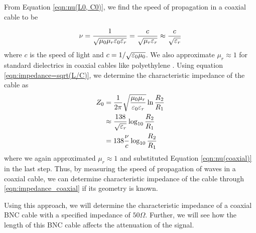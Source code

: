 \documentclass[
	a4paper, %
	10pt, %
	twoside, %
]{journal}
\begin{document}
From Equation \ref{eqn:nu(L0, C0)}, we find the speed of propagation in a coaxial cable to be 

\begin{equation}
    \label{eqn:nu(coaxial)}
    \nu = \frac1{\sqrt{\mu_0\mu_r\varepsilon_0\varepsilon_r}} = \frac{c}{\sqrt{\mu_r \varepsilon_r}} \approx \frac{c}{\sqrt{\varepsilon_r}}
\end{equation}
where $c$ is the speed of light and $c = 1/\sqrt{\varepsilon_0\mu_0}$. We also approximate $\mu_r \approx 1$ for standard dielectrics in coaxial cables like polyethylene \autocite{PHYS401Lecture04}. Using equation \ref{eqn:impedance=sqrt(L/C)}, we determine the characteristic impedance of the cable as 
\begin{align}
    Z_0 &= \frac1{2\pi}\sqrt{\frac{\mu_0\mu_r}{\varepsilon_0\varepsilon_r}} \ln \frac{R_2}{R_1} \\ 
    &\approx \frac{138}{\sqrt{\varepsilon_r}} \log_{10} \frac{R_2}{R_1}\\
    \label{eqn:impedance_coaxial}
    &= 138\frac{\nu}{c} \log_{10} \frac{R_2}{R_1} 
\end{align}
where we again approximated $\mu_r \approx 1$ and substituted Equation \ref{eqn:nu(coaxial)} in the last step. Thus, by measuring the speed of propagation of waves in a coaxial cable, we can determine characteristic impedance of the cable through \ref{eqn:impedance_coaxial} if its geometry is known.

Using this approach, we will determine the characteristic impedance of a coaxial BNC cable with a specified impedance of $50\Omega$. Further, we will see how the length of this BNC cable affects the attenuation of the signal. 

\end{document}
